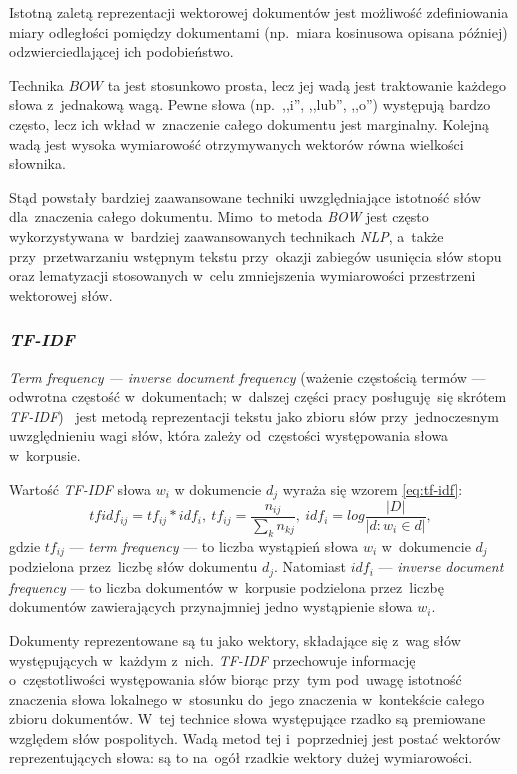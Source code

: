 \documentclass[pl]{minipw} %
\begin{document}
Istotną zaletą reprezentacji wektorowej dokumentów jest możliwość zdefiniowania miary odległości pomiędzy dokumentami (np.~miara kosinusowa opisana później) odzwierciedlającej ich podobieństwo.

Technika $BOW$ ta jest stosunkowo prosta, lecz jej wadą jest traktowanie każdego słowa z~jednakową wagą. Pewne słowa (np.~,,i'', ,,lub'', ,,o'') występują bardzo często, lecz ich wkład w~znaczenie całego dokumentu jest marginalny. Kolejną wadą jest wysoka wymiarowość otrzymywanych wektorów równa wielkości słownika.

Stąd powstały bardziej zaawansowane techniki uwzględniające istotność słów dla~znaczenia całego dokumentu. Mimo~to metoda \textit{BOW} jest często wykorzystywana w~bardziej zaawansowanych technikach \textit{NLP}, a~także przy~przetwarzaniu wstępnym tekstu przy~okazji zabiegów usunięcia słów stopu oraz lematyzacji stosowanych w~celu zmniejszenia wymiarowości przestrzeni wektorowej słów.
\subsubsection{\textit{TF-IDF}}

\textit{Term frequency --- inverse document frequency} (ważenie częstością termów --- odwrotna częstość w~dokumentach; w~dalszej części pracy posługuję~się skrótem \textit{TF-IDF})~\cite{tf_idf} jest metodą reprezentacji tekstu jako zbioru słów przy~jednoczesnym uwzględnieniu wagi słów, która zależy od~częstości występowania słowa w~korpusie.

Wartość \textit{TF-IDF} słowa $w_i$ w dokumencie $d_j$ wyraża się wzorem \ref{eq:tf-idf}: 
\begin{equation}
\label{eq:tf-idf}
tfidf_{ij} = tf_{ij} * idf_i,\ tf_{ij} = \frac{n_{ij}}{\sum\limits_{k}n_{kj}},\ idf_i = log\frac{|D|}{|{d:w_i \in d}|},
\end{equation}
gdzie $tf_{ij}$ --- \textit{term frequency} --- to liczba wystąpień słowa $w_i$ w~dokumencie $d_j$ podzielona przez~liczbę słów dokumentu $d_j$. Natomiast $idf_i$ --- \textit{inverse document frequency} --- to liczba dokumentów w~korpusie podzielona przez~liczbę dokumentów zawierających przynajmniej jedno wystąpienie słowa $w_i$.

Dokumenty reprezentowane są tu jako wektory, składające się z~wag słów występujących w~każdym z~nich. \textit{TF-IDF} przechowuje informację o~częstotliwości występowania słów biorąc przy~tym pod~uwagę istotność znaczenia słowa lokalnego w~stosunku do~jego znaczenia w~kontekście całego zbioru dokumentów. W~tej technice słowa występujące rzadko są premiowane względem słów pospolitych. Wadą metod tej i~poprzedniej jest postać wektorów reprezentujących słowa: są to na~ogół rzadkie wektory dużej wymiarowości.
\end{document}
